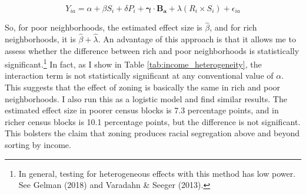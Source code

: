 \documentclass[11pt]{article}
\begin{document}
\begin{equation} \label{eqn:full_model_FEs_incomehetero}
    Y_{ia}=\alpha+\beta S_i+\delta P_i+\boldsymbol{\gamma}\cdot\boldsymbol{B_a}+\lambda (R_i\times S_i)+\epsilon_{ia}
\end{equation}

So, for poor neighborhoods, the estimated effect size is $\hat{\beta}$, and for rich neighborhoods, it is $\hat{\beta}+\hat{\lambda}$. An advantage of this approach is that it allows me to assess whether the difference between rich and poor neighborhoods is statistically significant.\footnote{In general, testing for heterogeneous effects with this method has low power. See Gelman (2018) and Varadahn \& Seeger (2013).} In fact, as I show in Table \ref{tab:income_heterogeneity}, the interaction term is not statistically significant at any conventional value of $\alpha$. This suggests that the effect of zoning is basically the same in rich and poor neighborhoods. I also run this as a logistic model and find similar results. The estimated effect size in poorer census blocks is 7.3 percentage points, and in richer census blocks is 10.1 percentage points, but the difference is not significant. This bolsters the claim that zoning produces racial segregation above and beyond sorting by income.
\end{document}
